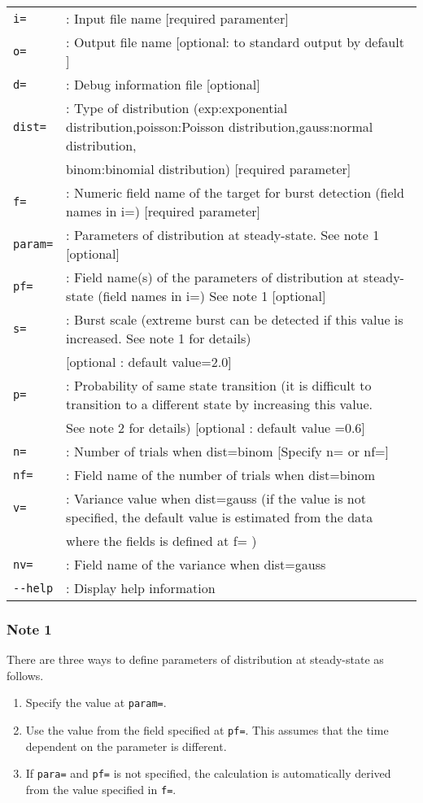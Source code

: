 \begin{table}[htbp]
{\small
\begin{tabular}{ll}
\verb|i=|     & : Input file name [required paramenter]  \\
\verb|o=|     & : Output file name [optional: to standard output by default ]\\
\verb|d=|     & :  Debug information file [optional] \\
\verb|dist=|  & : Type of distribution (exp:exponential distribution,poisson:Poisson distribution,gauss:normal distribution,\\
&   binom:binomial distribution) [required parameter] \\
\verb|f=|     & : Numeric field name of the target for burst detection  (field names in i=) [required parameter]  \\
\verb|param=| & : Parameters of distribution at steady-state. See note 1 [optional] \\
\verb|pf=|    & : Field name(s) of the parameters of distribution at steady-state (field names in i=) See note 1 [optional] \\
\verb|s=|     & : Burst scale (extreme burst can be detected if this value is increased. See note 1 for details) \\
&   [optional : default value=2.0] \\
\verb|p=|     & : Probability of same state transition (it is difficult to transition to a different state by increasing this value. \\
	& See note 2 for details) [optional : default value =0.6] \\
\verb|n=|     & : Number of trials when dist=binom [Specify n= or nf=] \\
\verb|nf=|    & : Field name of the number of trials when  dist=binom \\
\verb|v=|     & : Variance value when  dist=gauss (if the value is not specified, the default value is estimated from the data \\
	&   where the fields is defined at f= ) \\
\verb|nv=|    & : Field name of the variance when dist=gauss \\
\verb|--help| & : Display help information \\
\end{tabular} 
}
\end{table} 

\subsubsection*{Note 1}
There are three ways to define parameters of distribution at steady-state as follows.
\begin{enumerate}
\item Specify the value at \verb|param=|.
\item Use the value from the field specified at \verb|pf=|. This assumes that the time dependent on the parameter is different. 
\item If \verb|para=| and \verb|pf=| is not specified, the calculation is automatically derived from the value specified in \verb|f=|.
\end{enumerate}

